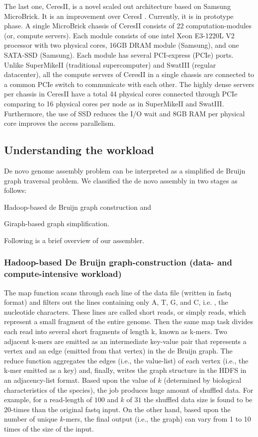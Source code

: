 \documentclass[conference]{IEEEtran}
\begin{document}
The last one, CeresII, is a novel scaled out architecture based on Samsung MicroBrick. It is an improvement over CeresI \cite{Cluster:ceres1}. Currently, it is in prototype phase.  
A single MicroBrick chassis of CeresII consists of 22 computation-modules (or, compute servers). Each module consists of one intel Xeon E3-1220L V2 processor with two physical cores, 16GB DRAM module (Samsung), and  one SATA-SSD (Samsung). Each module has several PCI-express (PCIe) ports.  Unlike SuperMikeII (traditional supercomputer) and SwatIII (regular datacenter), all the compute servers of CeresII in a single chassis are connected to a common PCIe switch to communicate with each other. The highly dense servers per chassis in CeresII have a total 44 physical cores connected through PCIe comparing to 16 physical cores per node as in SuperMikeII and SwatIII. Furthermore, the use of SSD reduces the I/O wait and 8GB RAM per physical core improves the access parallelism.

\subsection {Understanding the workload} \label{TheWorkload}
De novo genome assembly problem can be interpreted as a simplified de Bruijn graph traversal problem. We classified the de novo assembly in two stages as follows:
\begin{inparaenum}
\item Hadoop-based de Bruijn graph construction and
\item Giraph-based graph simplification.  
\end{inparaenum}
Following is a brief overview of our assembler. 

\subsubsection {Hadoop-based De Bruijn graph-construction (data- and compute-intensive workload)}
The map function scans through each line of the data file (written in fastq format) and filters out the lines containing only A, T, G, and C, i.e. , the nucleotide characters. These lines are called short reads, or simply reads, which represent a small fragment of the entire genome. Then the same map task divides each read into several short fragments of length k,  known as k-mers. Two adjacent  k-mers are emitted as an intermediate key-value pair that represents a vertex and an edge (emitted from that vertex) in the de Bruijn graph. The reduce function aggregates the edges (i.e., the value-list) of each vertex (i.e., the k-mer emitted as a key) and, finally, writes the graph structure in the HDFS in an adjacency-list format. Based upon the value of $k$ (determined by biological characteristics of the species), the job produces huge amount of shuffled data. For example, for a read-length of $100$ and $k$ of $31$ the shuffled data size is found to be 20-times than the original fastq input. On the other hand, based upon the number of unique $k$-mers, the final output (i.e., the graph) can vary from 1 to 10 times of the size of the input. 
\end{document}

